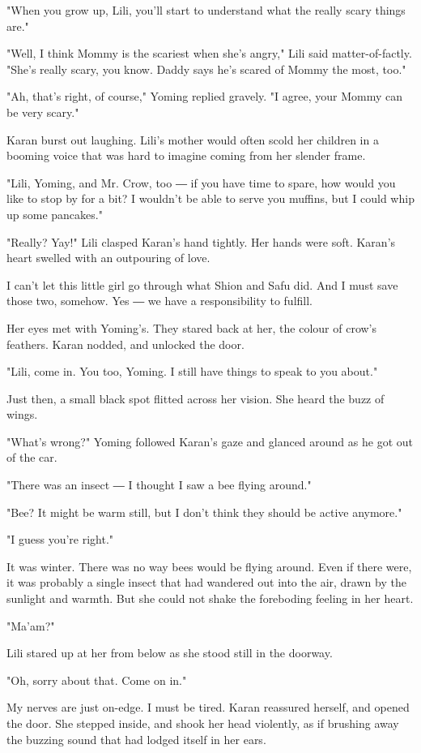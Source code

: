 "When you grow up, Lili, you'll start to understand what the really
scary things are."

"Well, I think Mommy is the scariest when she's angry," Lili said
matter-of-factly. "She's really scary, you know. Daddy says he's scared
of Mommy the most, too."

"Ah, that's right, of course," Yoming replied gravely. "I agree, your
Mommy can be very scary."

Karan burst out laughing. Lili's mother would often scold her children
in a booming voice that was hard to imagine coming from her slender
frame.

"Lili, Yoming, and Mr. Crow, too ― if you have time to spare, how would
you like to stop by for a bit? I wouldn't be able to serve you muffins,
but I could whip up some pancakes."

"Really? Yay!" Lili clasped Karan's hand tightly. Her hands were soft.
Karan's heart swelled with an outpouring of love.

I can't let this little girl go through what Shion and Safu did. And I
must save those two, somehow. Yes ― we have a responsibility to fulfill.

Her eyes met with Yoming's. They stared back at her, the colour of
crow's feathers. Karan nodded, and unlocked the door.

"Lili, come in. You too, Yoming. I still have things to speak to you
about."

Just then, a small black spot flitted across her vision. She heard the
buzz of wings.

"What's wrong?" Yoming followed Karan's gaze and glanced around as he
got out of the car.

"There was an insect ― I thought I saw a bee flying around."

"Bee? It might be warm still, but I don't think they should be active
anymore."

"I guess you're right."

It was winter. There was no way bees would be flying around. Even if
there were, it was probably a single insect that had wandered out into
the air, drawn by the sunlight and warmth. But she could not shake the
foreboding feeling in her heart.

"Ma'am?"

Lili stared up at her from below as she stood still in the doorway.

"Oh, sorry about that. Come on in."

My nerves are just on-edge. I must be tired. Karan reassured herself,
and opened the door. She stepped inside, and shook her head violently,
as if brushing away the buzzing sound that had lodged itself in her
ears.

